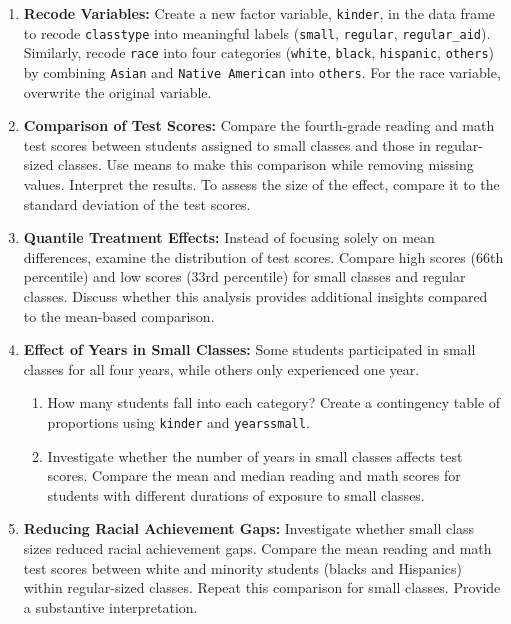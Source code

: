 \documentclass[12pt]{article}
\begin{document}
\begin{enumerate}
    \item \textbf{Recode Variables:} Create a new factor variable, \texttt{kinder}, in the data frame to recode \texttt{classtype} into meaningful labels (\texttt{small}, \texttt{regular}, \texttt{regular\_aid}). Similarly, recode \texttt{race} into four categories (\texttt{white}, \texttt{black}, \texttt{hispanic}, \texttt{others}) by combining \texttt{Asian} and \texttt{Native American} into \texttt{others}. For the race variable, overwrite the original variable.

    \item \textbf{Comparison of Test Scores:} Compare the fourth-grade reading and math test scores between students assigned to small classes and those in regular-sized classes. Use means to make this comparison while removing missing values. Interpret the results. To assess the size of the effect, compare it to the standard deviation of the test scores.

    \item \textbf{Quantile Treatment Effects:} Instead of focusing solely on mean differences, examine the distribution of test scores. Compare high scores (66th percentile) and low scores (33rd percentile) for small classes and regular classes. Discuss whether this analysis provides additional insights compared to the mean-based comparison.

    \item \textbf{Effect of Years in Small Classes:} Some students participated in small classes for all four years, while others only experienced one year. 
    \begin{enumerate}
        \item How many students fall into each category? Create a contingency table of proportions using \texttt{kinder} and \texttt{yearssmall}.
        \item Investigate whether the number of years in small classes affects test scores. Compare the mean and median reading and math scores for students with different durations of exposure to small classes.
    \end{enumerate}

    \item \textbf{Reducing Racial Achievement Gaps:} Investigate whether small class sizes reduced racial achievement gaps. Compare the mean reading and math test scores between white and minority students (blacks and Hispanics) within regular-sized classes. Repeat this comparison for small classes. Provide a substantive interpretation.


\end{enumerate}
\end{document}
